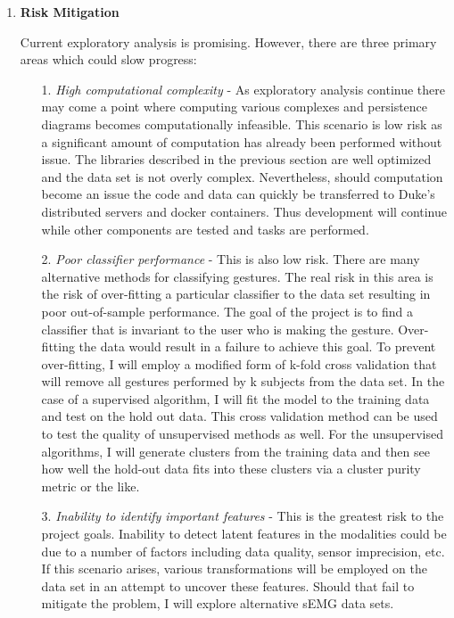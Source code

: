 \documentclass[11pt]{article}
\begin{document}
\begin{enumerate}
\item \textbf{Risk Mitigation}

Current exploratory analysis is promising. However, there are three primary areas which could slow progress:
\begin{enumerate}
\item[1.] \emph{High computational complexity} - As exploratory analysis continue there may come a point where computing various complexes and persistence diagrams becomes computationally infeasible. This scenario is low risk as a significant amount of computation has already been performed without issue. The libraries described in the previous section are well optimized and the data set is not overly complex. Nevertheless, should computation become an issue the code and data can quickly be transferred to Duke's distributed servers and docker containers. Thus development will continue while other components are tested and tasks are performed.
\item[2.] \emph{Poor classifier performance} - This is also low risk. There are many alternative methods for classifying gestures. The real risk in this area is the risk of over-fitting a particular classifier to the data set resulting in poor out-of-sample performance. The goal of the project is to find a classifier that is invariant to the user who is making the gesture. Over-fitting the data would result in a failure to achieve this goal. To prevent over-fitting, I will employ a modified form of k-fold cross validation that will remove all gestures performed by k subjects from the data set. In the case of a supervised algorithm, I will fit the model to the training data and test on the hold out data. This cross validation method can be used to test the quality of unsupervised methods as well. For the unsupervised algorithms, I will generate clusters from the training data and then see how well the hold-out data fits into these clusters via a cluster purity metric or the like.
\item[3.] \emph{Inability to identify important features} - This is the greatest risk to the project goals. Inability to detect latent features in the modalities could be due to a number of factors including data quality, sensor imprecision, etc. If this scenario arises, various transformations will be employed on the data set in an attempt to uncover these features. Should that fail to mitigate the problem, I will explore alternative sEMG data sets.
\end{enumerate}

\end{enumerate}
\end{document}
